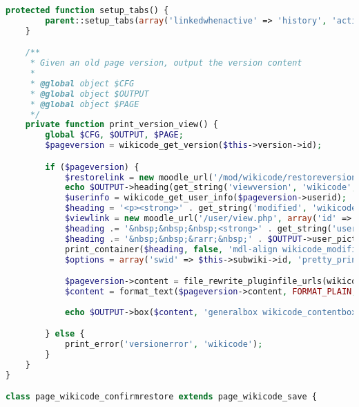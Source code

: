 \begin{lstlisting}[language=PHP]
    protected function setup_tabs() {
        parent::setup_tabs(array('linkedwhenactive' => 'history', 'activetab' => 'history', 'inactivetabs' => array('edit')));
    }

    /**
     * Given an old page version, output the version content
     *
     * @global object $CFG
     * @global object $OUTPUT
     * @global object $PAGE
     */
    private function print_version_view() {
        global $CFG, $OUTPUT, $PAGE;
        $pageversion = wikicode_get_version($this->version->id);

        if ($pageversion) {
            $restorelink = new moodle_url('/mod/wikicode/restoreversion.php', array('pageid' => $this->page->id, 'versionid' => $this->version->id));
            echo $OUTPUT->heading(get_string('viewversion', 'wikicode', $pageversion->version) . '<br />' . html_writer::link($restorelink->out(false), '(' . get_string('restorethis', 'wikicode') . ')', array('class' => 'wikicode_restore')) . '&nbsp;', 4);
            $userinfo = wikicode_get_user_info($pageversion->userid);
            $heading = '<p><strong>' . get_string('modified', 'wikicode') . ':</strong>&nbsp;' . userdate($pageversion->timecreated, get_string('strftimedatetime', 'langconfig'));
            $viewlink = new moodle_url('/user/view.php', array('id' => $userinfo->id));
            $heading .= '&nbsp;&nbsp;&nbsp;<strong>' . get_string('user') . ':</strong>&nbsp;' . html_writer::link($viewlink->out(false), fullname($userinfo));
            $heading .= '&nbsp;&nbsp;&rarr;&nbsp;' . $OUTPUT->user_picture(wikicode_get_user_info($pageversion->userid), array('popup' => true)) . '</p>';
            print_container($heading, false, 'mdl-align wikicode_modifieduser wikicode_headingtime');
            $options = array('swid' => $this->subwiki->id, 'pretty_print' => true, 'pageid' => $this->page->id);

            $pageversion->content = file_rewrite_pluginfile_urls(wikicode_remove_tags($pageversion->content), 'pluginfile.php', $this->modcontext->id, 'mod_wikicode', 'attachments', $this->subwiki->id);
    		$content = format_text($pageversion->content, FORMAT_PLAIN, array('overflowdiv'=>true));
			
            echo $OUTPUT->box($content, 'generalbox wikicode_contentbox');

        } else {
            print_error('versionerror', 'wikicode');
        }
    }
}

class page_wikicode_confirmrestore extends page_wikicode_save {


\end{lstlisting}
